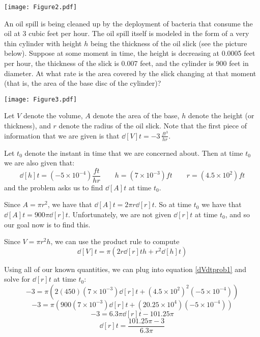 \documentclass[handout,nooutcomes]{ximera}
\begin{document}
	\begin{image}
	\texttt{[image: Figure2.pdf]}
	\end{image}

\begin{problem}
An oil spill is being cleaned up by the deployment of bacteria that consume the oil at 3 cubic feet per hour.  The oil spill itself is modeled in the form of a very thin cylinder with height $h$ being the thickness of the oil slick (see the picture below).  Suppose at some moment in time, the height is decreasing at 0.0005 feet per hour, the thickness of the slick is 0.007 feet, and the cylinder is 900 feet in diameter.  At what rate is the area covered by the slick changing at that moment (that is, the area of the base disc of the cylinder)?
	\begin{image}
	\texttt{[image: Figure3.pdf]}
	\end{image}
	
		\begin{freeResponse}
		Let $V$ denote the volume, $A$ denote the area of the base, $h$ denote the height (or thickness), and $r$ denote the radius of the oil slick.  Note that the first piece of information that we are given is that $\dd[V]{t} = -3 \, \frac{ft^3}{hr}$.  
		
		Let $t_0$ denote the instant in time that we are concerned about.  Then at time $t_0$ we are also given that:
		$$ \dd[h]{t} = \left( -5 \times 10^{-4} \right) \frac{ft}{hr}  \qquad  h = \left( 7 \times 10^{-3} \right) ft  \qquad  r = \left( 4.5 \times 10^2 \right) ft $$
		and the problem asks us to find $\dd[A]{t}$ at time $t_0$.  
		
		Since $A = \pi r^2$, we have that $\dd[A]{t} = 2 \pi r \dd[r]{t}$.  So at time $t_0$ we have that $\dd[A]{t} = 900 \pi \dd[r]{t}$.  Unfortunately, we are not given $\dd[r]{t}$ at time $t_0$, and so our goal now is to find this.
		
		Since $V = \pi r^2 h$, we can use the product rule to compute
		\begin{equation}\label{dVdtprob1}
		\dd[V]{t} = \pi \left( 2r \dd[r]{t} h + r^2 \dd[h]{t} \right)
		\end{equation}
		
		Using all of our known quantities, we can plug into equation \ref{dVdtprob1} and solve for $\dd[r]{t}$ at time $t_0$:
		$$ -3 = \pi \left( 2(450)(7 \times 10^{-3}) \dd[r]{t} + (4.5 \times 10^2)^2(-5 \times 10^{-4}) \right) $$
		$$ -3 = \pi \left( 900(7 \times 10^{-3}) \dd[r]{t} + (20.25 \times 10^4) (-5 \times 10^{-4}) \right) $$
		$$ -3 = 6.3 \pi \dd[r]{t} -101.25 \pi $$
		$$ \dd[r]{t} = \frac{101.25 \pi - 3}{6.3 \pi} $$
		

\end{freeResponse}
\end{problem}
\end{document}
